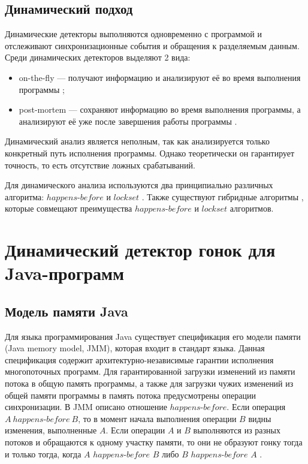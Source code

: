 \subsection{Динамический подход}
Динамические детекторы выполняются одновременно с программой и отслеживают синхронизационные события и обращения к разделяемым данным. Среди динамических детекторов выделяют 2 вида: 
\begin{itemize}
\item on-the-fly --- получают информацию и анализируют её во время выполнения программы \cite{Choi:2002:EPD:543552.512560};
\item post-mortem --- сохраняют информацию во время выполнения программы, а анализируют её уже после завершения работы программы \cite{PostMortem}.
\end{itemize}
Динамический анализ является неполным, так как анализируется только конкретный путь исполнения программы. Однако теоретически он гарантирует точность, то есть отсутствие ложных срабатываний. 

Для динамического анализа используются два принципиально различных алгоритма: $happens$-$before$ \cite{DRD, Happens-Before} и $lockset$ \cite{DRD, LockSet, GoldiLocks}. Также существуют гибридные алгоритмы \cite{DRD, Choi:2002:EPD:543552.512560}, которые совмещают преимущества $happens$-$before$ и $lockset$ алгоритмов. 


\FloatBarrier
\section{Динамический детектор гонок для Java-программ}

\FloatBarrier
\subsection{Модель памяти Java}
Для языка программирования Java существует спецификация его модели памяти (Java memory model, JMM), которая входит в стандарт языка. Данная спецификация содержит архитектурно-независимые гарантии исполнения многопоточных программ.
Для гарантированной загрузки изменений из памяти потока в общую память программы, а также для загрузки чужих изменений из общей памяти программы в память потока предусмотрены операции синхронизации. В JMM описано отношение $happens$-$before$. Если операция $A\ happens$-$before\ B$, то в момент начала выполнения операции $B$ видны изменения, выполненные $A$. Если операции $A$ и $B$ выполняются из разных потоков и обращаются к одному участку памяти, то они не образуют гонку тогда и только тогда, когда $A$ $happens$-$before$ $B$ либо $B$ $happens$-$before$ $A$ \cite{JMM}.



